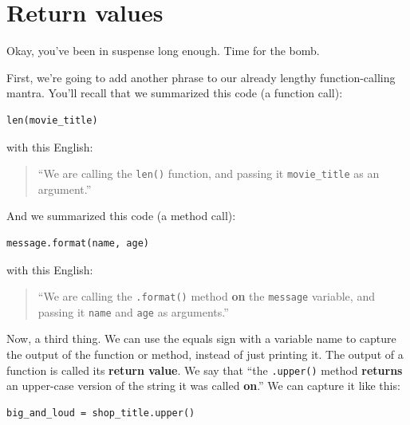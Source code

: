 \section{Return values}

Okay, you've been in suspense long enough. Time for the bomb.

First, we're going to add another phrase to our already lengthy
function-calling mantra. You'll recall that we summarized this code (a function
call):

\begin{Verbatim}[fontsize=\small,samepage=true,frame=single,framesep=3mm]
len(movie_title)
\end{Verbatim}

with this English:

\begin{quote}
``We are calling the \texttt{len()} function, and passing it
\texttt{movie\_title} as an argument.''
\end{quote}

And we summarized this code (a method call):

\begin{Verbatim}[fontsize=\small,samepage=true,frame=single,framesep=3mm]
message.format(name, age)
\end{Verbatim}

with this English:

\begin{quote}
``We are calling the \texttt{.format()} method \textbf{on} the \texttt{message}
variable, and passing it \texttt{name} and \texttt{age} as arguments.''
\end{quote}

Now, a third thing. We can use the equals sign with a variable name to
capture the output of the function or method, instead of just printing it. The
output of a function is called its \textbf{return value}. We say that ``the
\texttt{.upper()} method \textbf{returns} an upper-case version of the string
it was called \textbf{on}.'' We can capture it like this:

\begin{Verbatim}[fontsize=\small,samepage=true,frame=single,framesep=3mm]
big_and_loud = shop_title.upper()
\end{Verbatim}

